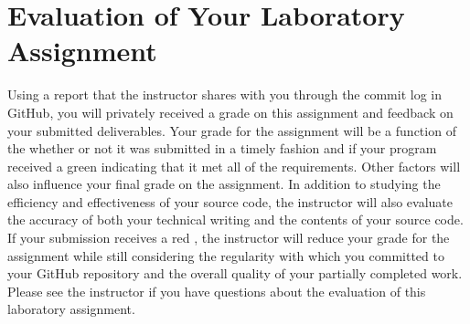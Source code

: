 \documentclass[11pt]{article}
\newcommand{\checkmark}{\ding{51}}
\newcommand{\naughtmark}{\ding{55}}
\begin{document}
\vspace*{-.15in}

\section*{Evaluation of Your Laboratory Assignment}

Using a report that the instructor shares with you through the commit log in
GitHub, you will privately received a grade on this assignment and feedback on
your submitted deliverables. Your grade for the assignment will be a function of
the whether or not it was submitted in a timely fashion and if your program
received a green \checkmark{} indicating that it met all of the requirements.
Other factors will also influence your final grade on the assignment. In
addition to studying the efficiency and effectiveness of your source code, the
instructor will also evaluate the accuracy of both your technical writing and
the contents of your source code. If your submission receives a red
\naughtmark{}, the instructor will reduce your grade for the assignment while
still considering the regularity with which you committed to your GitHub
repository and the overall quality of your partially completed work. Please see
the instructor if you have questions about the evaluation of this laboratory
assignment.
\end{document}
